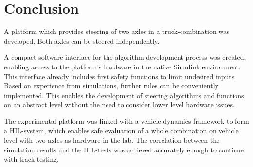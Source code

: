 \documentclass[root.tex]{subfiles}
\begin{document}
{\pagestyle{empty}}
\section{Conclusion}
\label{chap:Conclusion}


A platform which provides steering of two axles in a truck-combination was developed. Both axles can be steered independently.

A compact software interface for the algorithm development process was created, enabling access to the platform's hardware in the native Simulink environment. This interface already includes first safety functions to limit undesired inputs. Based on experience from simulations, further rules can be conveniently implemented. This enables the development of steering algorithms and functions on an abstract level without the need to consider lower level hardware issues. 

The experimental platform was linked with a vehicle dynamics framework to form a \gls{HIL}-system, which enables safe evaluation of a whole combination on vehicle level with two axles as hardware in the lab. The correlation between the simulation results and the \gls{HIL}-tests was achieved accurately enough to continue with track testing. 
\end{document}
